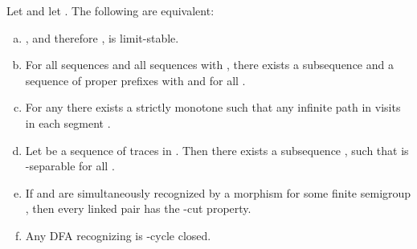 \begin{theorem}\label{thm:lim_trace_char}
Let  and let . The following are equivalent:
\begin{enumerate}[(a)]
\item , and therefore , is limit-stable.\label{thm:lim_trace_char:1}
\item For all sequences  and all sequences  with , there exists a subsequence  and a sequence  of proper prefixes  with  and  for all .\label{thm:lim_trace_char:2}
\item For any  there exists a strictly monotone  such that any infinite path  in  visits  in each segment .\label{thm:lim_trace_char:3}
\item Let  be a sequence of traces in . Then there exists a subsequence , such that  is -separable for all .\label{thm:lim_trace_char:4}
\item If  and  are simultaneously recognized by a morphism  for some finite semigroup , then every linked pair  has the -cut property. \label{thm:lim_trace_char:5}  
\item Any DFA  recognizing  is -cycle closed.\label{thm:lim_trace_char:6}  
\end{enumerate}
\end{theorem}
